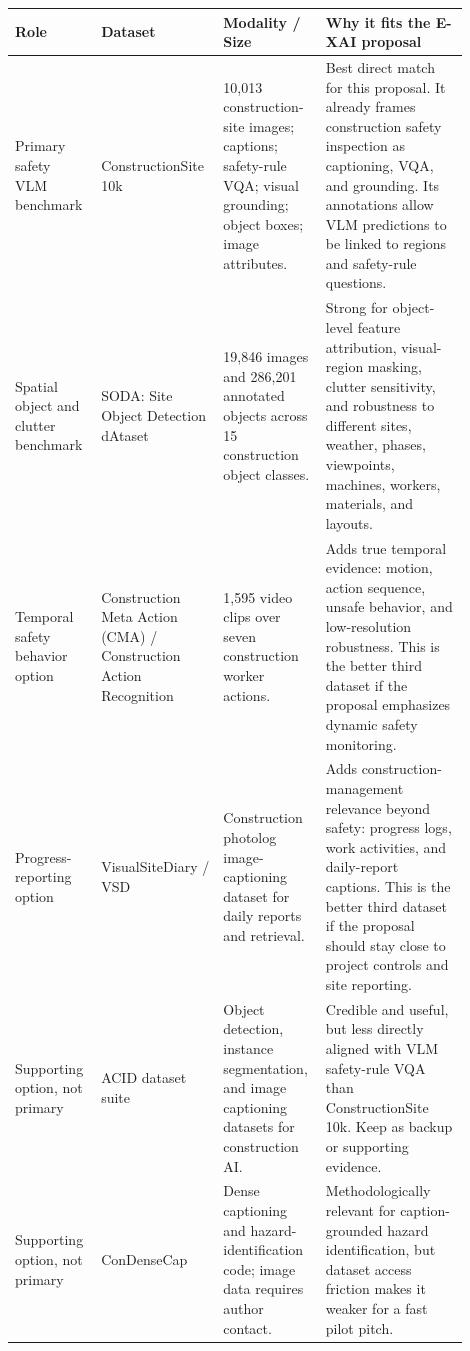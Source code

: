 \documentclass[10pt]{article}
\begin{document}
\begin{longtable}{L{0.18\linewidth} L{0.24\linewidth} L{0.18\linewidth} L{0.30\linewidth}}
\toprule
\textbf{Role} & \textbf{Dataset} & \textbf{Modality / Size} & \textbf{Why it fits the E-XAI proposal} \\
\midrule
\endhead
Primary safety VLM benchmark & ConstructionSite 10k & 10,013 construction-site images; captions; safety-rule VQA; visual grounding; object boxes; image attributes. & Best direct match for this proposal. It already frames construction safety inspection as captioning, VQA, and grounding. Its annotations allow VLM predictions to be linked to regions and safety-rule questions. \\
\midrule
Spatial object and clutter benchmark & SODA: Site Object Detection dAtaset & 19,846 images and 286,201 annotated objects across 15 construction object classes. & Strong for object-level feature attribution, visual-region masking, clutter sensitivity, and robustness to different sites, weather, phases, viewpoints, machines, workers, materials, and layouts. \\
\midrule
Temporal safety behavior option & Construction Meta Action (CMA) / Construction Action Recognition & 1,595 video clips over seven construction worker actions. & Adds true temporal evidence: motion, action sequence, unsafe behavior, and low-resolution robustness. This is the better third dataset if the proposal emphasizes dynamic safety monitoring. \\
\midrule
Progress-reporting option & VisualSiteDiary / VSD & Construction photolog image-captioning dataset for daily reports and retrieval. & Adds construction-management relevance beyond safety: progress logs, work activities, and daily-report captions. This is the better third dataset if the proposal should stay close to project controls and site reporting. \\
\midrule
Supporting option, not primary & ACID dataset suite & Object detection, instance segmentation, and image captioning datasets for construction AI. & Credible and useful, but less directly aligned with VLM safety-rule VQA than ConstructionSite 10k. Keep as backup or supporting evidence. \\
\midrule
Supporting option, not primary & ConDenseCap & Dense captioning and hazard-identification code; image data requires author contact. & Methodologically relevant for caption-grounded hazard identification, but dataset access friction makes it weaker for a fast pilot pitch. \\
\bottomrule
\end{longtable}
\end{document}
